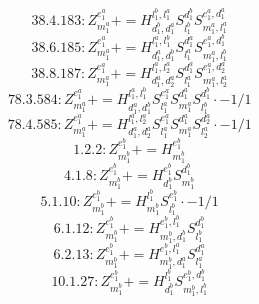 \documentclass[letterpaper,10pt,fleqn,leqno,onecolumn]{article}
\begin{document}
\begin{equation} \;\;\;\;\;\;  38.4.183: Z^{e_{1}^{a}}_{m_{1}^{a}}+=H^{l_{1}^{b},l_{1}^{a}}_{d_{1}^{b},d_{1}^{a}}S^{d_{1}^{b}}_{l_{1}^{b}}S^{e_{1}^{a},d_{1}^{a}}_{m_{1}^{a},l_{1}^{a}} \end{equation}
\begin{equation} \;\;\;\;\;\;  38.6.185: Z^{e_{1}^{a}}_{m_{1}^{a}}+=H^{l_{1}^{a},l_{1}^{b}}_{d_{1}^{a},d_{1}^{b}}S^{d_{1}^{a}}_{l_{1}^{a}}S^{e_{1}^{a},d_{1}^{b}}_{m_{1}^{a},l_{1}^{b}} \end{equation}
\begin{equation} \;\;\;\;\;\;  38.8.187: Z^{e_{1}^{a}}_{m_{1}^{a}}+=H^{l_{1}^{a},l_{2}^{a}}_{d_{1}^{a},d_{2}^{a}}S^{d_{1}^{a}}_{l_{1}^{a}}S^{e_{1}^{a},d_{2}^{a}}_{m_{1}^{a},l_{2}^{a}} \end{equation}
\begin{equation} \;\;\;\;\;\;  78.3.584: Z^{e_{1}^{a}}_{m_{1}^{a}}+=H^{l_{1}^{a},l_{1}^{b}}_{d_{1}^{a},d_{1}^{b}}S^{e_{1}^{a}}_{l_{1}^{a}}S^{d_{1}^{a}}_{m_{1}^{a}}S^{d_{1}^{b}}_{l_{1}^{b}}\cdot -1/1 \end{equation}
\begin{equation} \;\;\;\;\;\;  78.4.585: Z^{e_{1}^{a}}_{m_{1}^{a}}+=H^{l_{1}^{a},l_{2}^{a}}_{d_{1}^{a},d_{2}^{a}}S^{e_{1}^{a}}_{l_{1}^{a}}S^{d_{1}^{a}}_{m_{1}^{a}}S^{d_{2}^{a}}_{l_{2}^{a}}\cdot -1/1 \end{equation}
\begin{equation} \;\;\;\;\;\;  1.2.2: Z^{e_{1}^{b}}_{m_{1}^{b}}+=H^{e_{1}^{b}}_{m_{1}^{b}} \end{equation}
\begin{equation} \;\;\;\;\;\;  4.1.8: Z^{e_{1}^{b}}_{m_{1}^{b}}+=H^{e_{1}^{b}}_{d_{1}^{b}}S^{d_{1}^{b}}_{m_{1}^{b}} \end{equation}
\begin{equation} \;\;\;\;\;\;  5.1.10: Z^{e_{1}^{b}}_{m_{1}^{b}}+=H^{l_{1}^{b}}_{m_{1}^{b}}S^{e_{1}^{b}}_{l_{1}^{b}}\cdot -1/1 \end{equation}
\begin{equation} \;\;\;\;\;\;  6.1.12: Z^{e_{1}^{b}}_{m_{1}^{b}}+=H^{e_{1}^{b},l_{1}^{b}}_{m_{1}^{b},d_{1}^{b}}S^{d_{1}^{b}}_{l_{1}^{b}} \end{equation}
\begin{equation} \;\;\;\;\;\;  6.2.13: Z^{e_{1}^{b}}_{m_{1}^{b}}+=H^{e_{1}^{b},l_{1}^{a}}_{m_{1}^{b},d_{1}^{a}}S^{d_{1}^{a}}_{l_{1}^{a}} \end{equation}
\begin{equation} \;\;\;\;\;\;  10.1.27: Z^{e_{1}^{b}}_{m_{1}^{b}}+=H^{l_{1}^{b}}_{d_{1}^{b}}S^{e_{1}^{b},d_{1}^{b}}_{m_{1}^{b},l_{1}^{b}} \end{equation}
\end{document}
